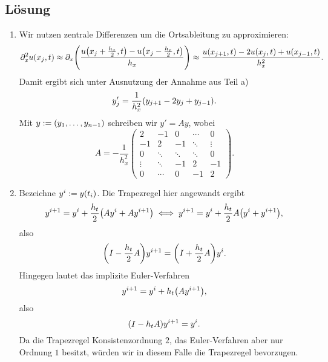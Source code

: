 \documentclass{exercise}
\begin{document}
    \subsection*{Lösung}
    \begin{enumerate}
        \item Wir nutzen zentrale Differenzen um die Ortsableitung zu approximieren:
        \[
            \partial_x^2 u\parentheses*{x_j, t} \approx \partial_x\parentheses*{\frac{u\parentheses*{x_j + \frac{h_x}{2}, t} - u\parentheses*{x_j - \frac{h_x}{2}, t}}{h_x}} \approx \frac{u\parentheses*{x_{j + 1}, t} - 2u\parentheses*{x_j, t} + u\parentheses*{x_{j - 1}, t}}{h_x^2}.
        \]
        Damit ergibt sich unter Ausnutzung der Annahme aus Teil a)
        \[
            y_j' = \frac{1}{h_x^2}\parentheses*{y_{j + 1} - 2y_j + y_{j - 1}}.
        \]
        Mit \(y := \parentheses*{y_1, \ldots, y_{n - 1}}\) schreiben wir \(y' = Ay\), wobei
        \[
            A = -\frac{1}{h_x^2}\begin{pmatrix}
                2 & -1 & 0 & \cdots & 0\\
                -1 & 2 & -1 & \ddots & \vdots\\
                0 & \ddots & \ddots & \ddots & 0\\
                \vdots & \ddots & -1 & 2 & -1\\
                0 & \cdots & 0 & -1 & 2
            \end{pmatrix}.
        \]
        \item Bezeichne \(y^i := y\parentheses*{t_i}\).
        Die Trapezregel hier angewandt ergibt
        \[
            y^{i + 1} = y^i + \frac{h_t}{2}\parentheses*{Ay^i + Ay^{i + 1}} \iff y^{i + 1} = y^i + \frac{h_t}{2}A\parentheses*{y^i + y^{i + 1}},
        \]
        also
        \[
            \parentheses*{I - \frac{h_t}{2}A}y^{i + 1} = \parentheses*{I + \frac{h_t}{2}A}y^i.
        \]
        Hingegen lautet das implizite Euler-Verfahren
        \[
            y^{i + 1} = y^i + h_t\parentheses*{Ay^{i + 1}},
        \]
        also
        \[
            \parentheses*{I - h_t A}y^{i + 1} = y^i.
        \]
        Da die Trapezregel Konsistenzordnung \(2\), das Euler-Verfahren aber nur Ordnung \(1\) besitzt, würden wir in diesem Falle die Trapezregel bevorzugen.
    \end{enumerate}
\end{document}
